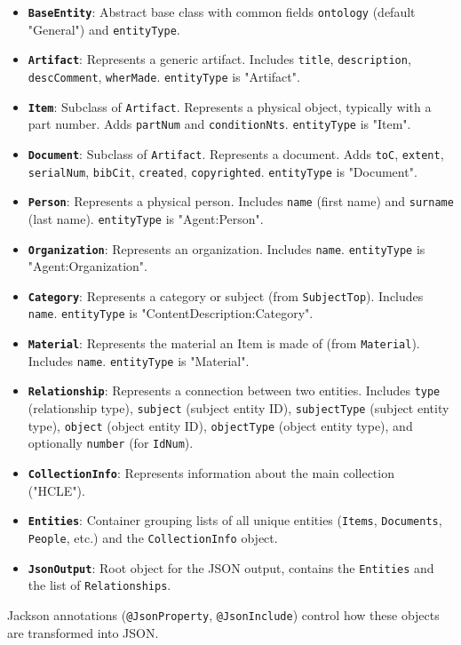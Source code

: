 \documentclass[11pt, a4paper]{article}
\begin{document}
\begin{itemize}
    \item \textbf{\texttt{BaseEntity}}: Abstract base class with common fields \texttt{ontology} (default "General") and \texttt{entityType}.
    \item \textbf{\texttt{Artifact}}: Represents a generic artifact. Includes \texttt{title}, \texttt{description}, \texttt{descComment}, \texttt{wherMade}. \texttt{entityType} is "Artifact".
    \item \textbf{\texttt{Item}}: Subclass of \texttt{Artifact}. Represents a physical object, typically with a part number. Adds \texttt{partNum} and \texttt{conditionNts}. \texttt{entityType} is "Item".
    \item \textbf{\texttt{Document}}: Subclass of \texttt{Artifact}. Represents a document. Adds \texttt{toC}, \texttt{extent}, \texttt{serialNum}, \texttt{bibCit}, \texttt{created}, \texttt{copyrighted}. \texttt{entityType} is "Document".
    \item \textbf{\texttt{Person}}: Represents a physical person. Includes \texttt{name} (first name) and \texttt{surname} (last name). \texttt{entityType} is "Agent:Person".
    \item \textbf{\texttt{Organization}}: Represents an organization. Includes \texttt{name}. \texttt{entityType} is "Agent:Organization".
    \item \textbf{\texttt{Category}}: Represents a category or subject (from \texttt{SubjectTop}). Includes \texttt{name}. \texttt{entityType} is "ContentDescription:Category".
    \item \textbf{\texttt{Material}}: Represents the material an Item is made of (from \texttt{Material}). Includes \texttt{name}. \texttt{entityType} is "Material".
    \item \textbf{\texttt{Relationship}}: Represents a connection between two entities. Includes \texttt{type} (relationship type), \texttt{subject} (subject entity ID), \texttt{subjectType} (subject entity type), \texttt{object} (object entity ID), \texttt{objectType} (object entity type), and optionally \texttt{number} (for \texttt{IdNum}).
    \item \textbf{\texttt{CollectionInfo}}: Represents information about the main collection ("HCLE").
    \item \textbf{\texttt{Entities}}: Container grouping lists of all unique entities (\texttt{Items}, \texttt{Documents}, \texttt{People}, etc.) and the \texttt{CollectionInfo} object.
    \item \textbf{\texttt{JsonOutput}}: Root object for the JSON output, contains the \texttt{Entities} and the list of \texttt{Relationships}.
\end{itemize}
Jackson annotations (\texttt{@JsonProperty}, \texttt{@JsonInclude}) control how these objects are transformed into JSON.
\end{document}
